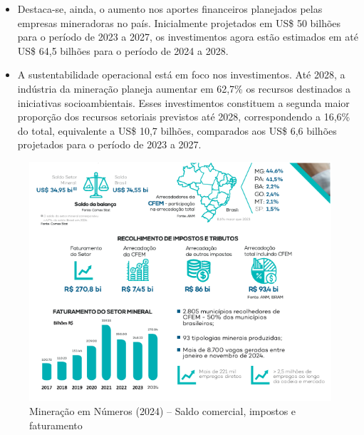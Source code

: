 \begin{itemize}
\item Destaca-se, ainda, o aumento nos aportes financeiros planejados pelas empresas mineradoras no país. Inicialmente projetados em US\$ 50 bilhões para o período de 2023 a 2027, os investimentos agora estão estimados em até US\$ 64,5 bilhões para o período de 2024 a 2028.

\item A sustentabilidade operacional está em foco nos investimentos. Até 2028, a indústria da mineração planeja aumentar em 62,7\% os recursos destinados a iniciativas socioambientais. Esses investimentos constituem a segunda maior proporção dos recursos setoriais previstos até 2028, correspondendo a 16,6\% do total, equivalente a US\$ 10,7 bilhões, comparados aos US\$ 6,6 bilhões projetados para o período de 2023 a 2027.
\end{itemize}

\begin{figure}[htb]
    \centering
    \includegraphics[width=\textwidth]{figures/mineracao_numeros_1.png}
    \caption{Mineração em Números (2024) -- Saldo comercial, impostos e faturamento}
    \label{fig:mineracao_numeros_1}
\end{figure}

